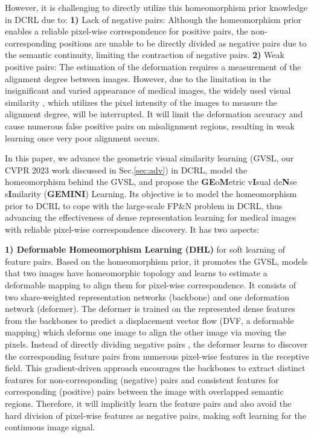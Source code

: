However, it is challenging to directly utilize this homeomorphism prior knowledge in DCRL due to: \textbf{1)} Lack of negative pairs: Although the homeomorphism prior enables a reliable pixel-wise correspondence for positive pairs, the non-corresponding positions are unable to be directly divided as negative pairs due to the semantic continuity, limiting the contraction of negative pairs. \textbf{2)} Weak positive pairs: The estimation of the deformation requires a measurement of the alignment degree between images. However, due to the limitation in the insignificant and varied appearance of medical images, the widely used visual similarity \cite{7987758,ba2018un,haskins2020deep,dalca2019unsupervised,He_2023_CVPR}, which utilizes the pixel intensity of the images to measure the alignment degree, will be interrupted. It will limit the deformation accuracy and cause numerous false positive pairs on misalignment regions, resulting in weak learning once very poor alignment occurs.

In this paper, we advance the geometric visual similarity learning (GVSL, our CVPR 2023 work \cite{He_2023_CVPR} discussed in Sec.\ref{sec:adv}) in DCRL, model the homeomorphism behind the GVSL, and propose the \textbf{GE}o\textbf{M}etric v\textbf{I}sual de\textbf{N}se s\textbf{I}milarity (\textbf{GEMINI}) Learning. Its objective is to model the homeomorphism prior to DCRL to cope with the large-scale FP\&N problem in DCRL, thus advancing the effectiveness of dense representation learning for medical images with reliable pixel-wise correspondence discovery. It has two aspects:

\textbf{1) Deformable Homeomorphism Learning (DHL)} for soft learning of feature pairs. Based on the homeomorphism prior, it promotes the GVSL, models that two images have homeomorphic topology and learns to estimate a deformable mapping to align them for pixel-wise correspondence. It consists of two share-weighted representation networks (backbone) and one deformation network (deformer). The deformer is trained on the represented dense features from the backbones to predict a displacement vector flow (DVF, a deformable mapping) which deforms one image to align the other image via moving the pixels. Instead of  directly dividing negative pairs \cite{li2021dense,o2020unsupervised,wang2022densecl,wang2022exploring,xie2021propagate}, the deformer learns to discover the corresponding feature pairs from numerous pixel-wise features in the receptive field. This gradient-driven approach encourages the backbones to extract distinct features for non-corresponding (negative) pairs and consistent features for corresponding (positive) pairs between the image with overlapped semantic regions. Therefore, it will implicitly learn the feature pairs and also avoid the hard division of pixel-wise features as negative pairs, making soft learning for the continuous image signal.

